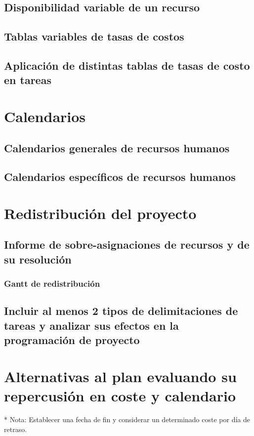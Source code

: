 \documentclass[11pt,a4paper,spanish,twoside]{report}
\begin{document}
\section{Disponibilidad variable de un recurso}

\section{Tablas variables de tasas de costos}

\section{Aplicación de distintas tablas de tasas de costo en tareas}

\chapter{Calendarios}
\section{Calendarios generales de recursos humanos}

\section{Calendarios específicos de recursos humanos}

\chapter{Redistribución del proyecto}
\section{Informe de sobre-asignaciones de recursos y de su 
  resolución}
\subsection{Gantt de redistribución}

\section{Incluir al menos 2 tipos de delimitaciones de tareas y 
  analizar sus efectos en la programación de proyecto}

\chapter{Alternativas al plan evaluando su repercusión en coste y 
  calendario}
* Nota: Establecer una fecha de fin y considerar un determinado coste por día
de retraso.
\end{document}
